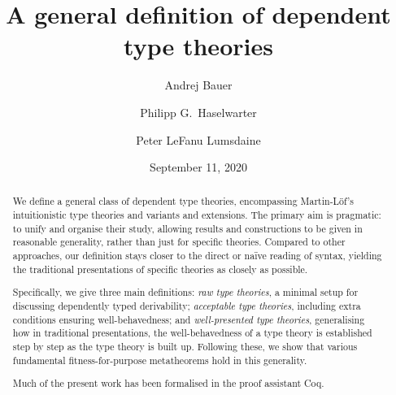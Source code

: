 \documentclass[a4paper]{article}
\begin{document}
\title{A general definition of dependent type theories}

\author{Andrej Bauer
  \and Philipp G.~Haselwarter
  \and Peter LeFanu Lumsdaine}

\date{September 11, 2020}

\maketitle



\begin{abstract}
  We define a general class of dependent type theories, encompassing Martin-Löf’s intuitionistic type theories and variants and extensions.
  The primary aim is pragmatic: to unify and organise their study, allowing results and constructions to be given in reasonable generality, rather than just for specific theories.
  Compared to other approaches, our definition stays closer to the direct or naïve reading of syntax, yielding the traditional presentations of specific theories as closely as possible.
  
  Specifically, we give three main definitions: \emph{raw type theories}, a minimal setup for discussing dependently typed derivability; \emph{acceptable type theories}, including extra conditions ensuring well-behavedness; and \emph{well-presented type theories}, generalising how in traditional presentations, the well-behavedness of a type theory is established step by step as the type theory is built up.
  Following these, we show that various fundamental fitness-for-purpose metatheorems hold in this generality.

  Much of the present work has been formalised in the proof assistant Coq.
\end{abstract}

\tableofcontents

\newpage












\appendix


% 
\end{document}
